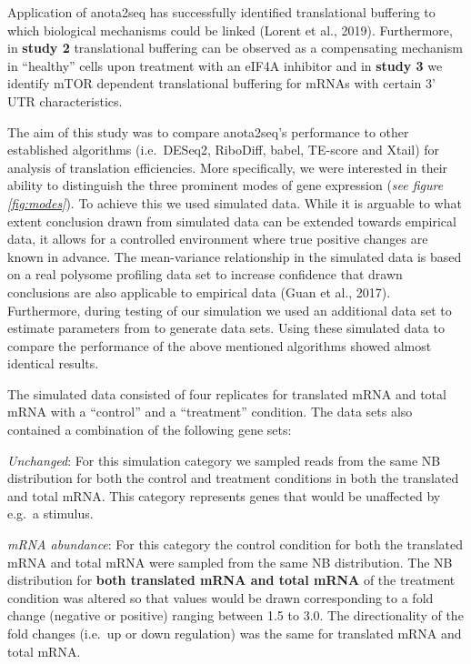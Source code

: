 \documentclass[12pt,openany]{book}
\begin{document}
Application of anota2seq has successfully identified translational
buffering to which biological mechanisms could be linked (Lorent et al.,
2019). Furthermore, in \textbf{study 2} translational buffering can be
observed as a compensating mechanism in ``healthy'' cells upon treatment
with an eIF4A inhibitor and in \textbf{study 3} we identify mTOR
dependent translational buffering for mRNAs with certain 3' UTR
characteristics.

The aim of this study was to compare anota2seq's performance to other
established algorithms (i.e.~DESeq2, RiboDiff, babel, TE-score and
Xtail) for analysis of translation efficiencies. More specifically, we
were interested in their ability to distinguish the three prominent
modes of gene expression (\emph{see figure \ref{fig:modes}}). To achieve
this we used simulated data. While it is arguable to what extent
conclusion drawn from simulated data can be extended towards empirical
data, it allows for a controlled environment where true positive changes
are known in advance. The mean-variance relationship in the simulated
data is based on a real polysome profiling data set to increase
confidence that drawn conclusions are also applicable to empirical data
(Guan et al., 2017). Furthermore, during testing of our simulation we
used an additional data set to estimate parameters from to generate data
sets. Using these simulated data to compare the performance of the above
mentioned algorithms showed almost identical results.

The simulated data consisted of four replicates for translated mRNA and
total mRNA with a ``control'' and a ``treatment'' condition. The data
sets also contained a combination of the following gene sets:

\emph{Unchanged}: For this simulation category we sampled reads from the
same NB distribution for both the control and treatment conditions in
both the translated and total mRNA. This category represents genes that
would be unaffected by e.g.~a stimulus.

\emph{mRNA abundance}: For this category the control condition for both
the translated mRNA and total mRNA were sampled from the same NB
distribution. The NB distribution for \textbf{both translated mRNA and
total mRNA} of the treatment condition was altered so that values would
be drawn corresponding to a fold change (negative or positive) ranging
between 1.5 to 3.0. The directionality of the fold changes (i.e.~up or
down regulation) was the same for translated mRNA and total mRNA.
\end{document}
